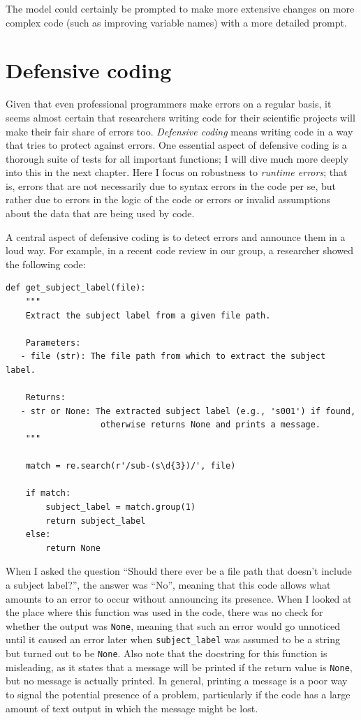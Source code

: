The model could certainly be prompted to make more extensive changes on more complex code (such as improving variable names) with a more detailed prompt.

\section{Defensive coding}

Given that even professional programmers make errors on a regular basis, it seems almost certain that researchers writing code for their scientific projects will make their fair share of errors too. \textit{Defensive coding} means writing code in a way that tries to protect against errors.
One essential aspect of defensive coding is a thorough suite of tests for all important functions; I will dive much more deeply into this in the next chapter.
Here I focus on robustness to \textit{runtime errors}; that is, errors that are not necessarily due to syntax errors in the code per se, but rather due to errors in the logic of the code or errors or invalid assumptions about the data that are being used by code. 

A central aspect of defensive coding is to detect errors and announce them in a loud way.
For example, in a recent code review in our group, a researcher showed the following code:

\begin{lstlisting}[style=Python]
def get_subject_label(file):
    """
    Extract the subject label from a given file path.

    Parameters:
   - file (str): The file path from which to extract the subject label.

    Returns:
   - str or None: The extracted subject label (e.g., 's001') if found, 
                   otherwise returns None and prints a message.
    """
    
    match = re.search(r'/sub-(s\d{3})/', file)
    
    if match:
        subject_label = match.group(1)
        return subject_label
    else:
        return None
\end{lstlisting}

When I asked the question ``Should there ever be a file path that doesn't include a subject label?'', the answer was ``No'', meaning that this code allows what amounts to an error to occur without announcing its presence.
When I looked at the place where this function was used in the code, there was no check for whether the output was \texttt{None}, meaning that such an error would go unnoticed until it caused an error later when \texttt{subject\_label} was assumed to be a string but turned out to be \texttt{None}.
Also note that the docstring for this function is misleading, as it states that a message will be printed if the return value is \texttt{None}, but no message is actually printed.
In general, printing a message is a poor way to signal the potential presence of a problem, particularly if the code has a large amount of text output in which the message might be lost.

